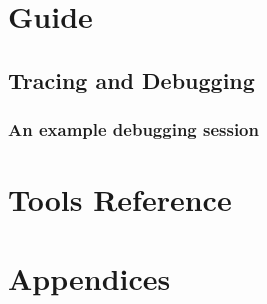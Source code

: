 \mainmatter

\part{Guide}





\chapter{Tracing and Debugging}
\section{An example debugging session}

\part{Tools Reference}





\part{Appendices}


